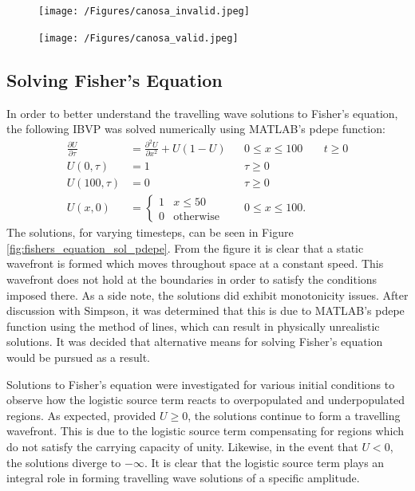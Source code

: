 \documentclass[11pt,a4paper]{article}
\begin{document}
		\begin{figure}[tbh]
			\centering
				\texttt{[image: /Figures/canosa\_invalid.jpeg]}
			\caption{\slshape }
			\label{fig:canosa_invalid}
		\end{figure}

		\begin{figure}[tbh]
			\centering
				\texttt{[image: /Figures/canosa\_valid.jpeg]}
			\caption{\slshape }
			\label{fig:canosa_valid}
		\end{figure}


	\subsection{Solving Fisher's Equation}
		\label{sub:solvingfishersequation}
		
		In order to better understand the travelling wave solutions to Fisher's equation, the following IBVP was solved numerically using MATLAB's pdepe function:
		\begin{align*}
			 \label{eq:fisherNumericIBVP}
			 \frac{\partial U}{\partial \tau} &= \frac{\partial^2 U}{\partial x^2} + U(1 - U) && 0 \le x \le 100 && t \ge 0 \\
			 U(0, \tau) &= 1 && \tau \ge 0 \\
			 U(100, \tau) &= 0 && \tau \ge 0 \\
			 U(x, 0) &= 
			 \begin{cases}
   				1 & x \le 50 \\
   				0 & \text{otherwise}
  			\end{cases}
  			&& 0 \le x \le 100.
		\end{align*}
		The solutions, for varying timesteps, can be seen in Figure \ref{fig:fishers_equation_sol_pdepe}. From the figure it is clear that a static wavefront is formed which moves throughout space at a constant speed. This wavefront does not hold at the boundaries in order to satisfy the conditions imposed there. As a side note, the solutions did exhibit monotonicity issues. After discussion with Simpson, it was determined that this is due to MATLAB's pdepe function using the method of lines, which can result in physically unrealistic solutions. It was decided that alternative means for solving Fisher's equation would be pursued as a result. 

		Solutions to Fisher's equation were investigated for various initial conditions to observe how the logistic source term reacts to overpopulated and underpopulated regions. As expected, provided $U \ge 0$, the solutions continue to form a travelling wavefront. This is due to the logistic source term compensating for regions which do not satisfy the carrying capacity of unity. Likewise, in the event that $U < 0$, the solutions diverge to $-\infty$. It is clear that the logistic source term plays an integral role in forming travelling wave solutions of a specific amplitude.
\end{document}
